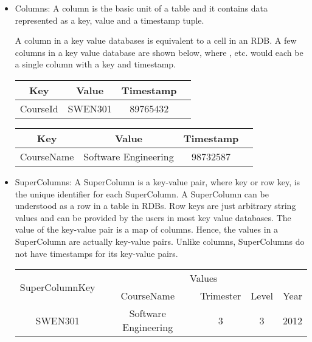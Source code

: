 \begin{itemize}
\item Columns:  A column is the basic unit of a table and it contains data represented
as a key, value and a timestamp tuple.

A column in a key value databases is equivalent to a cell in an \ac{RDB}. A few
columns in a key value database are shown below,
where ,  etc. would
each be a single column with a key and timestamp.

\begin{table}[h]
	\centering
	\begin{tabular}{ c c c c }
		\toprule
		\textbf{Key} & \textbf{Value} & \textbf{Timestamp} \\
		\midrule
		CourseId & SWEN301 & 89765432\\		
		\bottomrule
	\end{tabular}
\end{table}

\begin{table}[h]
	\centering
	\begin{tabular}{ c c c c }
		\toprule
		\textbf{Key} & \textbf{Value} & \textbf{Timestamp} \\
		\midrule
		CourseName & Software Engineering & 98732587\\
		\bottomrule
	\end{tabular}
\end{table}

\item SuperColumns: A SuperColumn is a key-value pair, where key or row key, is
the unique identifier for each SuperColumn. A SuperColumn can be understood as a row
in a table in \acp{RDB}. Row keys are just arbitrary string values and can be
provided by the users in most key value databases. The value of the key-value
pair is a map of columns. Hence, the values in a SuperColumn are actually
key-value pairs. Unlike columns, SuperColumns do not have timestamps for its
key-value pairs.

\begin{table}[h]
	\centering
	\begin{tabular}{ c c c c c }
		\toprule
		\multirow{2}{*}{SuperColumnKey} & \multicolumn{4}{c}{Values}\\

		& CourseName & Trimester & Level & Year\\ 
		\midrule
		SWEN301 & Software Engineering & 3 & 3 & 2012\\
		\bottomrule
	\end{tabular}
\end{table}


\end{itemize}

